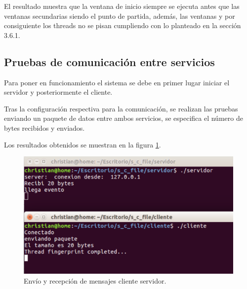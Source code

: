 El resultado muestra que la ventana de inicio siempre se ejecuta antes que las ventanas secundarias siendo el punto de partida, además, las ventanas y por consiguiente los threads no se pisan cumpliendo con lo planteado en la sección 3.6.1. 

\subsection{Pruebas de comunicación entre servicios}






Para poner en funcionamiento el sistema se debe en primer lugar iniciar el servidor y posteriormente el cliente.

Tras la configuración respectiva para la comunicación, se realizan las pruebas enviando un paquete de datos entre ambos servicios, se especifica el número de bytes recibidos y enviados. 

Los resultados obtenidos se muestran en la figura \ref{fig:mensaje}.

\begin{figure}[h]
	\centering
	\includegraphics[scale=.2]{./Figures/mensaje.png}
	\caption{Envío y recepción de mensajes cliente servidor.}
	\label{fig:mensaje}
\end{figure}

